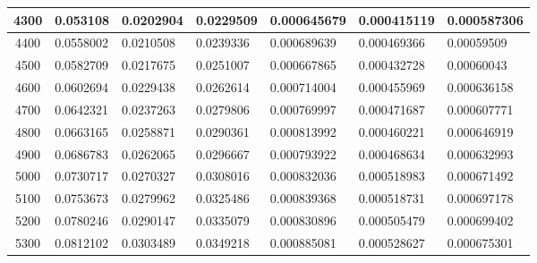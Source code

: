 \documentclass[11pt,spanish]{article} %
\begin{document}
\begin{center}
\begin{longtable}{|c|l|l|l|l|l|l|}
4300 & 0.053108                     & 0.0202904                      & 0.0229509                      & 0.000645679                    & 0.000415119                    & 0.000587306                   \\ \hline
4400 & 0.0558002                    & 0.0210508                      & 0.0239336                      & 0.000689639                    & 0.000469366                    & 0.00059509                    \\ \hline
4500 & 0.0582709                    & 0.0217675                      & 0.0251007                      & 0.000667865                    & 0.000432728                    & 0.00060043                    \\ \hline
4600 & 0.0602694                    & 0.0229438                      & 0.0262614                      & 0.000714004                    & 0.000455969                    & 0.000636158                   \\ \hline
4700 & 0.0642321                    & 0.0237263                      & 0.0279806                      & 0.000769997                    & 0.000471687                    & 0.000607771                   \\ \hline
4800 & 0.0663165                    & 0.0258871                      & 0.0290361                      & 0.000813992                    & 0.000460221                    & 0.000646919                   \\ \hline
4900 & 0.0686783                    & 0.0262065                      & 0.0296667                      & 0.000793922                    & 0.000468634                    & 0.000632993                   \\ \hline
5000 & 0.0730717                    & 0.0270327                      & 0.0308016                      & 0.000832036                    & 0.000518983                    & 0.000671492                   \\ \hline
5100 & 0.0753673                    & 0.0279962                      & 0.0325486                      & 0.000839368                    & 0.000518731                    & 0.000697178                   \\ \hline
5200 & 0.0780246                    & 0.0290147                      & 0.0335079                      & 0.000830896                    & 0.000505479                    & 0.000699402                   \\ \hline
5300 & 0.0812102                    & 0.0303489                      & 0.0349218                      & 0.000885081                    & 0.000528627                    & 0.000675301                   \\ \hline

\end{longtable}
\end{center}
\end{document}

